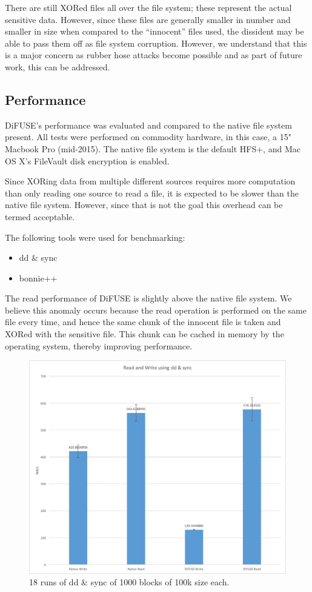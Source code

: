 \documentclass[10pt,twocolumn]{article}
\begin{document}
There are still XORed files all over the file system; these represent the actual sensitive data. However, since these files are generally smaller in number and smaller in size when compared to the ``innocent'' files used, the dissident may be able to pass them off as file system corruption. However, we understand that this is a major concern as rubber hose attacks become possible \cite{rubberhose} and as part of future work, this can be addressed.

\subsection{Performance}

DiFUSE's performance was evaluated and compared to the native file system present. All tests were performed on commodity hardware, in this case, a 15" Macbook Pro (mid-2015). The native file system is the default HFS+, and Mac OS X's FileVault disk encryption is enabled.

Since XORing data from multiple different sources requires more computation than only reading one source to read a file, it is expected to be slower than the native file system. However, since that is not the goal this overhead can be termed acceptable.

The following tools were used for benchmarking:
\begin{itemize}
\item dd \& sync
\item bonnie++
\end{itemize}

The read performance of DiFUSE is slightly above the native file system. We believe this anomaly occurs because the read operation is performed on the same file every time, and hence the same chunk of the innocent file is taken and XORed with the sensitive file. This chunk can be cached in memory by the operating system, thereby improving performance.
\begin{figure}[thpb]
  \centering
  	\includegraphics[width=\columnwidth]{dd}
    \caption{18 runs of dd \& sync of 1000 blocks of 100k size each. }
	\label{fig:dd}
\end{figure}
\end{document}
